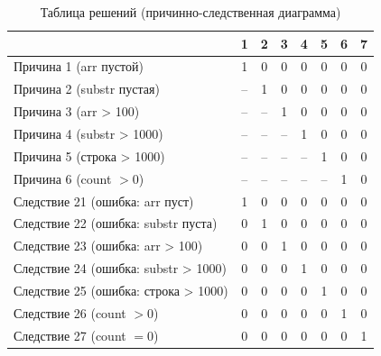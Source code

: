 \documentclass{article}[14pt]
\begin{document}
\begin{table}[H]
\centering
\caption{Таблица решений (причинно-следственная диаграмма)}
\renewcommand{\arraystretch}{1.4}
\begin{tabular}{|l|c|c|c|c|c|c|c|}
\hline
 & \textbf{1} & \textbf{2} & \textbf{3} & \textbf{4} & \textbf{5} & \textbf{6} & \textbf{7} \\
\hline
Причина 1 (arr пустой)         & 1 & 0 & 0 & 0 & 0 & 0 & 0 \\
\hline
Причина 2 (substr пустая)      & -- & 1 & 0 & 0 & 0 & 0 & 0 \\
\hline
Причина 3 (arr > 100)          & -- & -- & 1 & 0 & 0 & 0 & 0 \\
\hline
Причина 4 (substr > 1000)      & -- & -- & -- & 1 & 0 & 0 & 0 \\
\hline
Причина 5 (строка > 1000)      & -- & -- & -- & -- & 1 & 0 & 0 \\
\hline
Причина 6 (count $> 0$)        & -- & -- & -- & -- & -- & 1 & 0 \\
\hline
Следствие 21 (ошибка: arr пуст) & 1 & 0 & 0 & 0 & 0 & 0 & 0 \\
\hline
Следствие 22 (ошибка: substr пуста) & 0 & 1 & 0 & 0 & 0 & 0 & 0 \\
\hline
Следствие 23 (ошибка: arr > 100) & 0 & 0 & 1 & 0 & 0 & 0 & 0 \\
\hline
Следствие 24 (ошибка: substr > 1000) & 0 & 0 & 0 & 1 & 0 & 0 & 0 \\
\hline
Следствие 25 (ошибка: строка > 1000) & 0 & 0 & 0 & 0 & 1 & 0 & 0 \\
\hline
Следствие 26 (count $> 0$)     & 0 & 0 & 0 & 0 & 0 & 1 & 0 \\
\hline
Следствие 27 (count $= 0$)     & 0 & 0 & 0 & 0 & 0 & 0 & 1 \\
\hline
\end{tabular}
\end{table}
\end{document}
